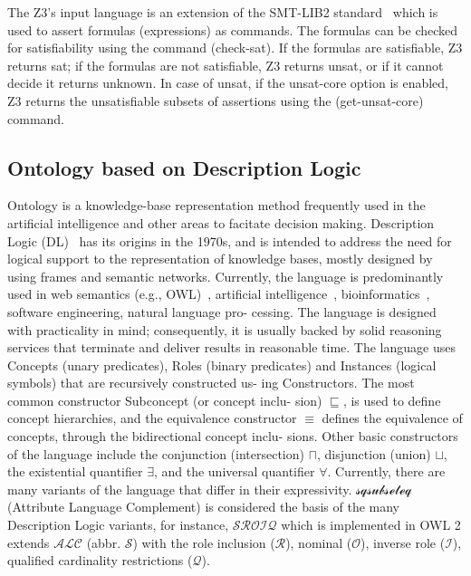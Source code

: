 The Z3's input language is an extension of the SMT-LIB2 standard~\cite{SMT-LIB} which is used to assert formulas (expressions) as commands. The formulas can be checked for satisfiability using the command (check-sat). If the formulas are satisfiable, Z3 returns sat; if the formulas are not satisfiable, Z3 returns unsat, or if it cannot decide it returns unknown. In case of unsat, if the unsat-core option is enabled, Z3 returns the unsatisfiable subsets of assertions using the (get-unsat-core) command.

\subsection*{Ontology based on Description Logic}
Ontology is a knowledge-base representation method frequently used in the artificial intelligence and other areas to facitate decision making. Description Logic (DL)~\cite{Baader2010TheApplications} has its origins in the 1970s, and is intended to address the need for logical support to the representation of knowledge bases, mostly designed by using frames and semantic networks. Currently, the language is predominantly used in web semantics (e.g., OWL)~\cite{Rudi Studer, V Richard Benjamins, and Dieter Fensel. Knowledge En}, artificial intelligence~\cite{10.1007/978-94-017-9297-4_7}, bioinformatics~\cite{Rector2006}, software engineering, natural language pro- cessing. The language is designed with practicality in mind; consequently, it is usually backed by solid reasoning services that terminate and deliver results in reasonable time. The language uses Concepts (unary predicates), Roles (binary predicates) and Instances (logical symbols) that are recursively constructed us- ing Constructors. The most common constructor Subconcept (or concept inclu- sion) $\sqsubseteq$, is used to define concept hierarchies, and the equivalence constructor $\equiv$ defines the equivalence of concepts, through the bidirectional concept inclu- sions. Other basic constructors of the language include the conjunction (intersection) $\sqcap$, disjunction (union) $\sqcup$, the existential quantifier $\exists$, and the universal quantifier $\forall$. Currently, there are many variants of the language that differ in their expressivity. $\mathcal{sqsubseteq}$ (Attribute Language Complement) is considered the basis of the many Description Logic variants, for instance, $\mathcal{SROIQ}$ which is implemented in OWL 2 extends $\mathcal{ALC}$ (abbr. $\mathcal{S}$) with the role inclusion ($\mathcal{R}$), nominal ($\mathcal{O}$), inverse role ($\mathcal{I}$), qualified cardinality restrictions ($\mathcal{Q}$). 

